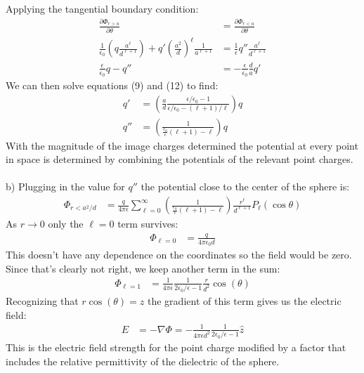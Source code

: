 \documentclass[a4paper,11pt]{article}
\numberwithin{equation}{section}
\newcommand{\ez}{\epsilon_0}
\newcommand{\lrp}[1]{\left({#1}\right)}
\begin{document}
Applying the tangential boundary condition:
\begin{align}
 \frac{\partial \Phi_{r>a}}{\partial \theta} &= \frac{\partial \Phi_{r<a}}{\partial \theta}\\
 \frac{1}{\ez}\lrp{q\frac{a^\ell}{d^{\ell+1}}}+q'\lrp{\frac{a^2}{d}}^\ell\frac{1}{a^{\ell+1}} &= \frac{1}{\epsilon}q''\frac{a^\ell}{d^{\ell+1}}\\
 \frac{\epsilon}{\ez}q-q'' &= -\frac{\epsilon}{\ez}\frac{d}{a}q'
\end{align}
We can then solve equations (9) and (12) to find:
\begin{align}
 q' &= \lrp{\frac{a}{d}\frac{\epsilon/\ez-1}{\epsilon/\ez-(\ell+1)/\ell}}q\\
 q'' &= \lrp{ \frac{1}{\frac{\ez}{\epsilon}(\ell+1)-\ell }}q
\end{align}
With the magnitude of the image charges determined the potential at every point in space is determined by combining the potentials of the relevant point charges.
\\
\\
b) Plugging in the value for $q''$ the potential close to the center of the sphere is:
\begin{align}
 \Phi_{r<a^2/d} &= \frac{q}{4\pi\epsilon} \sum_{\ell=0}^\infty \lrp{ \frac{1}{\frac{\ez}{\epsilon}(\ell+1)-\ell }} \frac{r^\ell}{d^{\ell+1}}P_\ell(\cos\theta)
\end{align}
As $r\rightarrow 0$ only the $\ell=0$ term survives:
\begin{align}
 \Phi_{\ell=0} &= \frac{q}{4\pi\ez d}
\end{align}
This doesn't have any dependence on the coordinates so the field would be zero. 
Since that's clearly not right, we keep another term in the sum:
\begin{align}
 \Phi_{\ell=1} &= \frac{1}{4\pi \epsilon}\frac{1}{2\ez/\epsilon-1}\frac{r}{d^2}\cos{(\theta)}
\end{align}
Recognizing that $r\cos{(\theta)}=z$ the gradient of this term gives us the electric field:
\begin{align}
 E &= -\nabla \Phi = -\frac{1}{4\pi\epsilon d^2}\frac{1}{2\ez/\epsilon-1} \hat{z}
\end{align}
This is the electric field strength for the point charge modified by a factor that includes the relative permittivity of the dielectric of the sphere.
\end{document}
